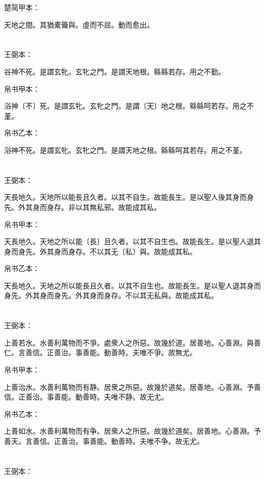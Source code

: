 \documentclass[a5paper]{ctexbook}
\begin{document}
    楚简甲本：

    天地之間。其猶橐籥與。虛而不屈。動而愈出。

    \chapter{}
    王弼本：

    谷神不死。是謂玄牝。玄牝之門。是謂天地根。緜緜若存。用之不勤。

    
    帛书甲本：

    浴神〔不〕死。是謂玄牝。玄牝之門。是謂〔天〕地之根。緜緜呵若存。用之不堇。

    帛书乙本：

    浴神不死。是謂玄牝。玄牝之門。是謂天地之根。緜緜呵其若存。用之不堇。

    \chapter{}
    王弼本：

    天長地久。天地所以能長且久者。以其不自生。故能長生。是以聖人後其身而身先。外其身而身存。非以其無私邪。故能成其私。

    
    帛书甲本：

    天長地久。天地之所以能〔長〕且久者。以其不自生也。故能長生。是以聖人退其身而身先。外其身而身存。不以其无〔私〕與。故能成其私。

    帛书乙本：

    天長地久。天地之所以能長且久者。以其不自生也。故能長生。是以聖人退其身而身先。外其身而身先。外其身而身存。不以其无私與。故能成其私。

    \chapter{}
    王弼本：

    上善若水。水善利萬物而不爭。處衆人之所惡。故幾於道。居善地。心善淵。與善仁。言善信。正善治。事善能。動善時。夫唯不爭。故無尤。

    
    帛书甲本：

    上善治水。水善利萬物而有静。居衆之所惡。故幾於道矣。居善地。心善淵。予善信。正善治。事善能。動善時。夫唯不静。故无尤。

    帛书乙本：

    上善如水。水善利萬物而有争。居衆人之所惡。故幾於道矣。居善地。心善淵。予善天。言善信。正善治。事善能。動善時。夫唯不争。故无尤。

    \chapter{}
    王弼本：
\end{document}
